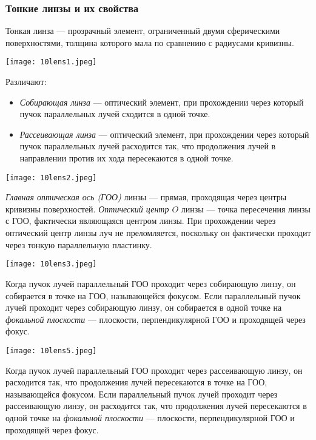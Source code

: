 \documentclass[12pt, a4paper]{article}%
\begin{document}
\subsubsection*{Тонкие линзы и их свойства}
Тонкая линза — прозрачный элемент, ограниченный двумя сферическими поверхностями, толщина которого мала по сравнению с радиусами кривизны. 

\begin{center}
\texttt{[image: 10lens1.jpeg]}
\label{fig:mpr}
\end{center}

Различают:
\begin{itemize}
  \item \textit{Собирающая линза} — оптический элемент, при прохождении через который пучок параллельных лучей сходится в одной точке.
  \item \textit{Рассеивающая линза} — оптический элемент, при прохождении через который пучок параллельных лучей расходится так, что продолжения лучей в направлении против их хода пересекаются в одной точке.
\end{itemize}

\begin{center}
\texttt{[image: 10lens2.jpeg]}
\label{fig:mpr}
\end{center}

\textit{Главная оптическая ось (ГОО)} линзы — прямая, проходящая через центры кривизны поверхностей. \textit{Оптический центр $O$} линзы  --- точка пересечения линзы с ГОО, фактически являющаяся центром линзы. При прохождении через оптический центр линзы луч не преломляется, поскольку он фактически проходит через тонкую параллельную пластинку. 

\begin{center}
\texttt{[image: 10lens3.jpeg]}
\label{fig:mpr}
\end{center}

Когда пучок лучей параллельный ГОО проходит через собирающую линзу, он собирается в точке на ГОО, называющейся фокусом. Если параллельный пучок лучей проходит через собирающую линзу, он собирается в одной точке на \textit{фокальной плоскости} — плоскости, перпендикулярной ГОО и проходящей через фокус. 

\begin{center}
\texttt{[image: 10lens5.jpeg]}
\label{fig:mpr}
\end{center}

Когда пучок лучей параллельный ГОО проходит через рассеивающую линзу, он расходится так, что продолжения лучей пересекаются в точке на ГОО, называющейся фокусом. Если параллельный пучок лучей проходит через рассеивающую линзу, он расходится так, что продолжения лучей пересекаются в одной точке на \textit{фокальной плоскости} — плоскости, перпендикулярной ГОО и проходящей через фокус. 
\end{document}
